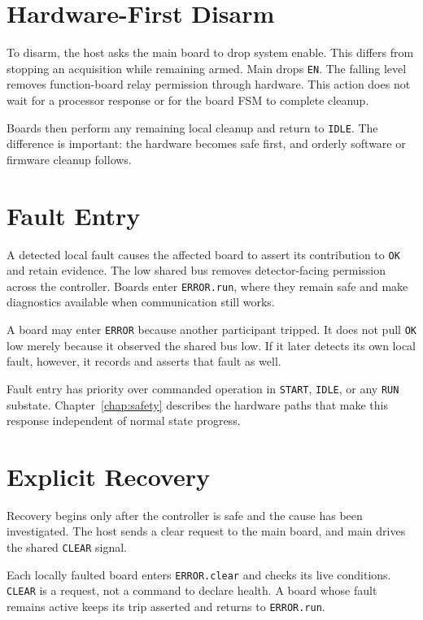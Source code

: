 \section{Hardware-First Disarm}

To disarm, the host asks the main board to drop system enable. This differs from stopping an acquisition while remaining armed. Main drops \texttt{EN}. The falling level removes function-board relay permission through hardware. This action does not wait for a processor response or for the board FSM to complete cleanup.

Boards then perform any remaining local cleanup and return to \texttt{IDLE}. The difference is important: the hardware becomes safe first, and orderly software or firmware cleanup follows.

\section{Fault Entry}

A detected local fault causes the affected board to assert its contribution to \texttt{OK} and retain evidence. The low shared bus removes detector-facing permission across the controller. Boards enter \texttt{ERROR.run}, where they remain safe and make diagnostics available when communication still works.

A board may enter \texttt{ERROR} because another participant tripped. It does not pull \texttt{OK} low merely because it observed the shared bus low. If it later detects its own local fault, however, it records and asserts that fault as well.

Fault entry has priority over commanded operation in \texttt{START}, \texttt{IDLE}, or any \texttt{RUN} substate. Chapter~\ref{chap:safety} describes the hardware paths that make this response independent of normal state progress.

\section{Explicit Recovery}

Recovery begins only after the controller is safe and the cause has been investigated. The host sends a clear request to the main board, and main drives the shared \texttt{CLEAR} signal.

Each locally faulted board enters \texttt{ERROR.clear} and checks its live conditions. \texttt{CLEAR} is a request, not a command to declare health. A board whose fault remains active keeps its trip asserted and returns to \texttt{ERROR.run}.

